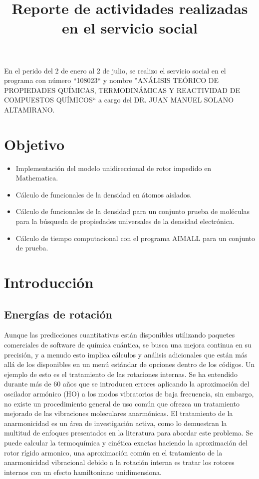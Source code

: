 \documentclass[12pt,letterpaper]{article}
\title{Reporte de actividades realizadas en el servicio social}
\author{}
\date{}
\begin{document}
\maketitle
En el perido del 2 de enero al 2 de julio, 
se realizo el servicio social en el programa con número
``108023`` y nombre
''ANÁLISIS TEÓRICO DE PROPIEDADES QUÍMICAS, TERMODINÁMICAS 
Y REACTIVIDAD DE COMPUESTOS QUÍMICOS`` a cargo del 
DR. JUAN MANUEL SOLANO ALTAMIRANO.\\


\section{Objetivo}
\begin{itemize}


\item Implementación del modelo unidireccional de rotor impedido en Mathematica.\\

\item Cálculo de funcionales de la densidad en átomos aislados.\\

\item Cálculo de funcionales de la densidad para un conjunto prueba de moléculas para la búsqueda de propiedades universales de la densidad electrónica.\\

\item Cálculo de tiempo computacional con el programa AIMALL para un conjunto de prueba.\\
 
\end{itemize}

\section{Introducción}
\subsection{Energías de rotación}
Aunque las predicciones cuantitativas están disponibles utilizando paquetes comerciales de software de química cuántica, se busca una mejora continua en su precisión, y a menudo esto implica cálculos y análisis adicionales que están más allá de los disponibles en un menú estándar de opciones dentro de los códigos. Un ejemplo de esto es el tratamiento de las rotaciones internas. Se ha entendido durante más de 60 años que se introducen errores aplicando la aproximación del oscilador armónico (HO) a los modos vibratorios de baja frecuencia, sin embargo, no existe un procedimiento general de uso común que ofrezca un tratamiento mejorado de las vibraciones moleculares anarmónicas. El tratamiento de la anarmonicidad es un área de investigación activa, como lo demuestran la multitud de enfoques presentados en la literatura para abordar este problema. 
Se puede calcular la termoquímica y cinética exactas haciendo la aproximación del rotor rígido armonico, una aproximación común en el tratamiento de la anarmonicidad vibracional debido a la rotación interna es tratar los rotores internos con un efecto hamiltoniano unidimensiona.
\\
\end{document}
